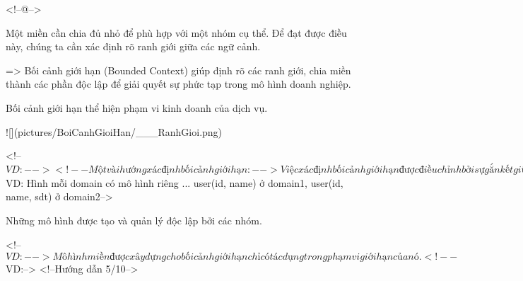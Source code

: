 

<!--@-->

Một miền cần chia đủ nhỏ để phù hợp với một nhóm cụ thể. Để đạt được điều này, chúng ta cần xác định rõ ranh giới giữa các ngữ cảnh.

=> Bối cảnh giới hạn (Bounded Context) giúp định rõ các ranh giới, chia miền thành các phần độc lập để giải quyết sự phức tạp trong mô hình doanh nghiệp.

Bối cảnh giới hạn thể hiện phạm vi kinh doanh của dịch vụ.

![](pictures/BoiCanhGioiHan/___RanhGioi.png)

<!--$VD:-->
<!--Một vài hướng xác định bối cảnh giới hạn:-->

Việc xác định bối cảnh giới hạn được điều chỉnh bởi sự gắn kết giữa các miền phụ trong miền kinh doanh.
Dựa vào sơ đồ cấu trúc tổ chức của doanh nghiệp.
Dựa vào modules của các ứng dụng kiến trúc nguyên khối hiện tại (nếu việc phân chia tốt).
Dựa vào trách nhiệm và hoạt động của chuyên gia ngành.

<!--Một số đặc điểm:-->

Mỗi liên hệ giới hạn phải được thể hiện thông qua một mô hình miền riêng biệt không có sự chia sẻ về mô hình.

<!--$VD: Hình mỗi domain có mô hình riêng ... user(id, name) ở domain1, user(id, name, sdt) ở domain2-->

Những mô hình được tạo và quản lý độc lập bởi các nhóm.

<!--$VD:-->

Mô hình miền được xây dựng cho bối cảnh giới hạn chỉ có tác dụng trong phạm vi giới hạn của nó.

<!--$VD:-->
<!--Hướng dẫn 5/10-->